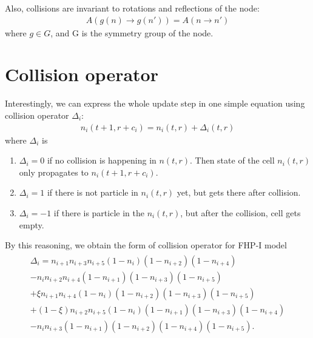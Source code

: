 Also, collisions are invariant to rotations and reflections of the node:
\begin{align*}
A(g(n) \rightarrow g(n')) = A(n \rightarrow n')
\end{align*}
where $g \in G$, and G is the symmetry group of the node.


\section{Collision operator}
Interestingly, we can express the whole update step in one simple equation using collision operator $\Delta_i$:
\begin{align} \label{withcol}
n_i(t+1,r+c_i) = n_i(t,r) + \Delta_i(t,r)
\end{align}
where $\Delta_i$ is
\begin{enumerate}
\item $\Delta_i = 0$ if no collision is happening in $n(t,r)$. Then state of the cell $n_i(t,r)$ only propagates to $n_i(t+1,r+c_i)$.
\item $\Delta_i = 1$ if there is not particle in $n_i(t,r)$ yet, but gets there after collision. 
\item $\Delta_i = -1$ if there is particle in the $n_i(t,r)$, but after the collision, cell gets empty.
\end{enumerate}

\bigskip


By this reasoning, we obtain the form of collision operator for FHP-I model
\begin{align} \label{colop}
\begin{split}
\Delta_i = n_{i+1}n_{i+3}n_{i+5}(1-n_i)(1-n_{i+2})(1-n_{i+4})\\
-n_in_{i+2}n_{i+4}(1-n_{i+1})(1-n_{i+3})(1-n_{i+5})\\
 + \xi n_{i+1}n_{i+4}(1-n_i)(1-n_{i+2})(1-n_{i+3})(1-n_{i+5})\\
 +(1-\xi)n_{i+2}n_{i+5}(1-n_i)(1-n_{i+1})(1-n_{i+3})(1-n_{i+4})\\
 -n_in_{i+3}(1-n_{i+1})(1-n_{i+2})(1-n_{i+4})(1-n_{i+5}).
\end{split}
\end{align}

